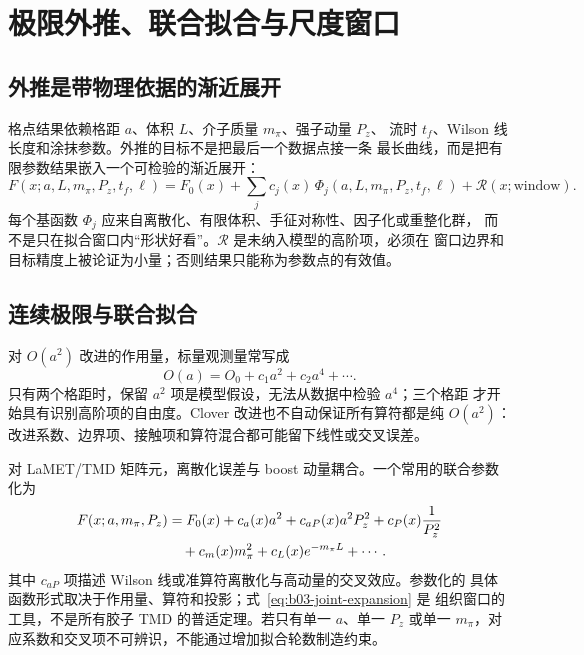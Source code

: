 \chapter{极限外推、联合拟合与尺度窗口}
\label{sec:b03-extrapolation-windows}

\section{外推是带物理依据的渐近展开}

格点结果依赖格距 \(a\)、体积 \(L\)、介子质量 \(m_\pi\)、强子动量 \(P_z\)、
流时 \(t_f\)、Wilson 线长度和涂抹参数。外推的目标不是把最后一个数据点接一条
最长曲线，而是把有限参数结果嵌入一个可检验的渐近展开：
\begin{equation}
  F(x;a,L,m_\pi,P_z,t_f,\ell)
  =F_0(x)+\sum_j c_j(x)\,\Phi_j(a,L,m_\pi,P_z,t_f,\ell)
  +\mathcal R(x;\text{window}).
  \label{eq:b03-general-expansion}
\end{equation}
每个基函数 \(\Phi_j\) 应来自离散化、有限体积、手征对称性、因子化或重整化群，
而不是只在拟合窗口内“形状好看”。\(\mathcal R\) 是未纳入模型的高阶项，必须在
窗口边界和目标精度上被论证为小量；否则结果只能称为参数点的有效值。

\section{连续极限与联合拟合}

对 \(O(a^2)\) 改进的作用量，标量观测量常写成
\begin{equation}
  O(a)=O_0+c_1a^2+c_2a^4+\cdots .
  \label{eq:b03-continuum-expansion}
\end{equation}
只有两个格距时，保留 \(a^2\) 项是模型假设，无法从数据中检验 \(a^4\)；三个格距
才开始具有识别高阶项的自由度。Clover 改进也不自动保证所有算符都是纯
\(O(a^2)\)：改进系数、边界项、接触项和算符混合都可能留下线性或交叉误差。

对 LaMET/TMD 矩阵元，离散化误差与 boost 动量耦合。一个常用的联合参数化为
\begin{align}
  F(x;a,m_\pi,P_z)
  &=F_0(x)+c_a(x)a^2+c_{aP}(x)a^2P_z^2
  +c_P(x)\frac{1}{P_z^2}\notag\\
  &\quad+c_m(x)m_\pi^2+c_L(x)e^{-m_\pi L}+\cdots .
  \label{eq:b03-joint-expansion}
\end{align}
其中 \(c_{aP}\) 项描述 Wilson 线或准算符离散化与高动量的交叉效应。参数化的
具体函数形式取决于作用量、算符和投影；式~\eqref{eq:b03-joint-expansion} 是
组织窗口的工具，不是所有胶子 TMD 的普适定理。若只有单一 \(a\)、单一 \(P_z\)
或单一 \(m_\pi\)，对应系数和交叉项不可辨识，不能通过增加拟合轮数制造约束。

